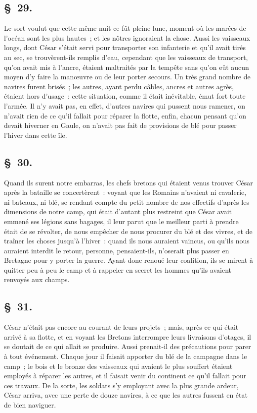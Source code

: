 \documentclass[french,twoside]{book} %
\begin{document}
\subsection[{§ 29.}]{ \textsc{§ 29.} }
\noindent Le sort voulut que cette même nuit ce fût pleine lune, moment où les marées de l’océan sont les plus hautes ; et les nôtres ignoraient la chose. Aussi les vaisseaux longs, dont César s’était servi pour transporter son infanterie et qu’il avait tirés au sec, se trouvèrent-ils remplis d’eau, cependant que les vaisseaux de transport, qu’on avait mis à l’ancre, étaient maltraités par la tempête sans qu’on eût aucun moyen d’y faire la manœuvre ou de leur porter secours. Un très grand nombre de navires furent brisés ; les autres, ayant perdu câbles, ancres et autres agrès, étaient hors d’usage : cette situation, comme il était inévitable, émut fort toute l’armée. Il n’y avait pas, en effet, d’autres navires qui pussent nous ramener, on n’avait rien de ce qu’il fallait pour réparer la flotte, enfin, chacun pensant qu’on devait hiverner en Gaule, on n’avait pas fait de provisions de blé pour passer l’hiver dans cette île.
\subsection[{§ 30.}]{ \textsc{§ 30.} }
\noindent Quand ils surent notre embarras, les chefs bretons qui étaient venus trouver César après la bataille se concertèrent : voyant que les Romains n’avaient ni cavalerie, ni bateaux, ni blé, se rendant compte du petit nombre de nos effectifs d’après les dimensions de notre camp, qui était d’autant plus restreint que César avait emmené ses légions sans bagages, il leur parut que le meilleur parti à prendre était de se révolter, de nous empêcher de nous procurer du blé et des vivres, et de traîner les choses jusqu’à l’hiver : quand ils nous auraient vaincus, ou qu’ils nous auraient interdit le retour, personne, pensaient-ils, n’oserait plus passer en Bretagne pour y porter la guerre. Ayant donc renoué leur coalition, ils se mirent à quitter peu à peu le camp et à rappeler en secret les hommes qu’ils avaient renvoyés aux champs.
\subsection[{§ 31.}]{ \textsc{§ 31.} }
\noindent César n’était pas encore au courant de leurs projets ; mais, après ce qui était arrivé à sa flotte, et en voyant les Bretons interrompre leurs livraisons d’otages, il se doutait de ce qui allait se produire. Aussi prenait-il des précautions pour parer à tout événement. Chaque jour il faisait apporter du blé de la campagne dans le camp ; le bois et le bronze des vaisseaux qui avaient le plus souffert étaient employés à réparer les autres, et il faisait venir du continent ce qu’il fallait pour ces travaux. De la sorte, les soldats s’y employant avec la plus grande ardeur, César arriva, avec une perte de douze navires, à ce que les autres fussent en état de bien naviguer.
\end{document}
